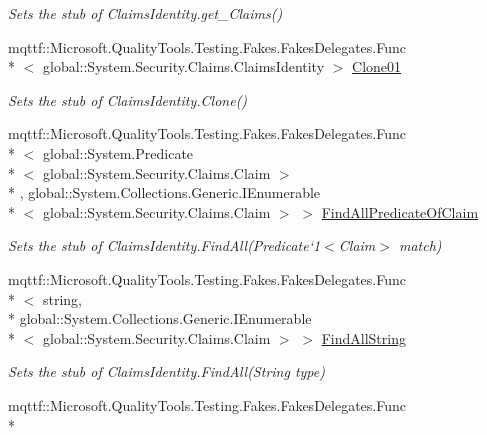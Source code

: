 \begin{DoxyCompactItemize}
\begin{DoxyCompactList}\small\item\em Sets the stub of Claims\-Identity.\-get\-\_\-\-Claims()\end{DoxyCompactList}\item 
mqttf\-::\-Microsoft.\-Quality\-Tools.\-Testing.\-Fakes.\-Fakes\-Delegates.\-Func\\*
$<$ global\-::\-System.\-Security.\-Claims.\-Claims\-Identity $>$ \hyperlink{class_system_1_1_security_1_1_claims_1_1_fakes_1_1_stub_claims_identity_a72a889d3f2dfdd1b5397b5fe3dfcedfa}{Clone01}
\begin{DoxyCompactList}\small\item\em Sets the stub of Claims\-Identity.\-Clone()\end{DoxyCompactList}\item 
mqttf\-::\-Microsoft.\-Quality\-Tools.\-Testing.\-Fakes.\-Fakes\-Delegates.\-Func\\*
$<$ global\-::\-System.\-Predicate\\*
$<$ global\-::\-System.\-Security.\-Claims.\-Claim $>$\\*
, global\-::\-System.\-Collections.\-Generic.\-I\-Enumerable\\*
$<$ global\-::\-System.\-Security.\-Claims.\-Claim $>$ $>$ \hyperlink{class_system_1_1_security_1_1_claims_1_1_fakes_1_1_stub_claims_identity_ab6cf8acbab7dde559b86c83d42210d7d}{Find\-All\-Predicate\-Of\-Claim}
\begin{DoxyCompactList}\small\item\em Sets the stub of Claims\-Identity.\-Find\-All(Predicate`1$<$Claim$>$ match)\end{DoxyCompactList}\item 
mqttf\-::\-Microsoft.\-Quality\-Tools.\-Testing.\-Fakes.\-Fakes\-Delegates.\-Func\\*
$<$ string, \\*
global\-::\-System.\-Collections.\-Generic.\-I\-Enumerable\\*
$<$ global\-::\-System.\-Security.\-Claims.\-Claim $>$ $>$ \hyperlink{class_system_1_1_security_1_1_claims_1_1_fakes_1_1_stub_claims_identity_aefea6aa24e3aae3c10a3de899d213581}{Find\-All\-String}
\begin{DoxyCompactList}\small\item\em Sets the stub of Claims\-Identity.\-Find\-All(\-String type)\end{DoxyCompactList}\item 
mqttf\-::\-Microsoft.\-Quality\-Tools.\-Testing.\-Fakes.\-Fakes\-Delegates.\-Func\\*

\end{DoxyCompactItemize}
